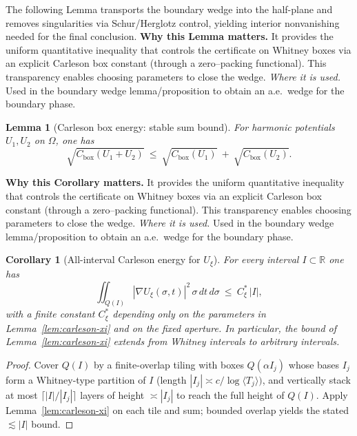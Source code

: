 \documentclass[11pt]{article}
\newtheorem{lemma}{Lemma}[section]
\newtheorem{corollary}{Corollary}[section]
\theoremstyle{definition}
\theoremstyle{remark}
\newcommand{\R}{\mathbb{R}}
\begin{document}
\vspace{0.87cm}
\noindent The following Lemma transports the boundary wedge into the half-plane and removes singularities
via Schur/Herglotz control, yielding interior nonvanishing needed for the final conclusion.
\noindent\textbf{Why this Lemma matters.} It provides the uniform quantitative inequality that controls the certificate on Whitney boxes via an explicit Carleson box constant (through a zero--packing functional). This transparency enables choosing parameters to close the wedge.
\noindent\textit{Where it is used.} Used in the boundary wedge lemma/proposition to obtain an a.e.\ wedge for the boundary phase.
\begin{lemma}[Carleson box energy: stable sum bound]
\label{lem:carleson-sum}
For harmonic potentials $U_1,U_2$ on $\Omega$, one has
\[
\sqrt{C_{\mathrm{box}}(U_1+U_2)}\ \le\
\sqrt{C_{\mathrm{box}}(U_1)}\ +\ \sqrt{C_{\mathrm{box}}(U_2)}.
\]
\end{lemma}




\vspace{0.87cm}
\noindent\textbf{Why this Corollary matters.} It provides the uniform quantitative inequality that controls the certificate on Whitney boxes via an explicit Carleson box constant (through a zero--packing functional). This transparency enables choosing parameters to close the wedge.
\noindent\textit{Where it is used.} Used in the boundary wedge lemma/proposition to obtain an a.e.\ wedge for the boundary phase.
\begin{corollary}[All-interval Carleson energy for $U_\xi$]\label{cor:xi-carleson-all-I}
For every interval $I\subset\R$ one has
\[
  \iint_{Q(I)} |\nabla U_{\xi}(\sigma,t)|^2\,\sigma\,dt\,d\sigma\ \le\ C_\xi^{\!*}\,|I|,
\]
with a finite constant $C_\xi^{\!*}$ depending only on the parameters in Lemma~\ref{lem:carleson-xi} and on the fixed aperture. In particular, the bound of Lemma~\ref{lem:carleson-xi} extends from Whitney intervals to arbitrary intervals.
\end{corollary}
\begin{proof}
Cover $Q(I)$ by a finite-overlap tiling with boxes $Q(\alpha I_j)$ whose bases $I_j$ form a Whitney-type partition of $I$ (length $|I_j|\asymp c/\log\langle T_j\rangle)$, and vertically stack at most $\lceil |I|/|I_j|\rceil$ layers of height $\asymp |I_j|$ to reach the full height of $Q(I)$. Apply Lemma~\ref{lem:carleson-xi} on each tile and sum; bounded overlap yields the stated $\lesssim |I|$ bound.
\end{proof}
\end{document}

